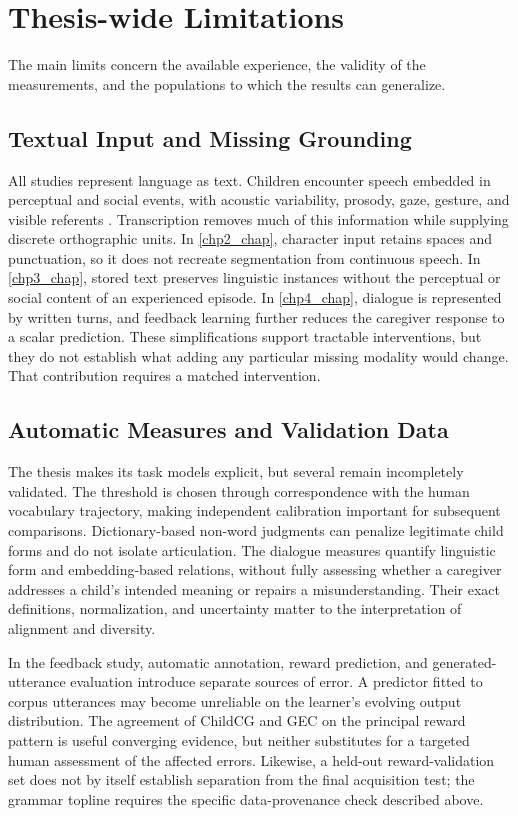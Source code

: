 \section{Thesis-wide Limitations}
\label{sec:gd_limitations}

The main limits concern the available experience, the validity of the measurements, and the populations to which the results can generalize.

\subsection{Textual Input and Missing Grounding}

All studies represent language as text. Children encounter speech embedded in perceptual and social events, with acoustic variability, prosody, gaze, gesture, and visible referents \citep{Tomasello1995,Csibra2009}. Transcription removes much of this information while supplying discrete orthographic units. In \cref{chp2_chap}, character input retains spaces and punctuation, so it does not recreate segmentation from continuous speech. In \cref{chp3_chap}, stored text preserves linguistic instances without the perceptual or social content of an experienced episode. In \cref{chp4_chap}, dialogue is represented by written turns, and feedback learning further reduces the caregiver response to a scalar prediction. These simplifications support tractable interventions, but they do not establish what adding any particular missing modality would change. That contribution requires a matched intervention.

\subsection{Automatic Measures and Validation Data}

The thesis makes its task models explicit, but several remain incompletely validated. The \meCDI{} threshold is chosen through correspondence with the human vocabulary trajectory, making independent calibration important for subsequent comparisons. Dictionary-based non-word judgments can penalize legitimate child forms and do not isolate articulation. The dialogue measures quantify linguistic form and embedding-based relations, without fully assessing whether a caregiver addresses a child's intended meaning or repairs a misunderstanding. Their exact definitions, normalization, and uncertainty matter to the interpretation of alignment and diversity.

In the feedback study, automatic annotation, reward prediction, and generated-utterance evaluation introduce separate sources of error. A predictor fitted to corpus utterances may become unreliable on the learner's evolving output distribution. The agreement of ChildCG and GEC on the principal reward pattern is useful converging evidence, but neither substitutes for a targeted human assessment of the affected errors. Likewise, a held-out reward-validation set does not by itself establish separation from the final acquisition test; the grammar topline requires the specific data-provenance check described above.

